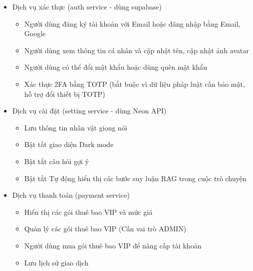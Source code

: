 

\begin{itemize}

\item Dịch vụ xác thực (auth service - dùng supabase)
\begin{itemize}
\item Người dùng đăng ký tài khoản với Email hoặc đăng nhập bằng Email, Google
\item Người dùng xem thông tin cá nhân và cập nhật tên, cập nhật ảnh avatar
\item Người dùng có thể đổi mật khẩu hoặc dùng quên mật khẩu
\item Xác thực 2FA bằng TOTP (bắt buộc vì dữ liệu pháp luật cần bảo mật, hỗ trợ đổi thiết bị TOTP)
\end{itemize}
\item Dịch vụ cài đặt (setting service - dùng Neon API)
\begin{itemize}
\item Lưu thông tin nhân vật giọng nói
\item Bật tắt giao diện Dark mode
\item Bật tắt câu hỏi gợi ý
\item Bật tắt Tự động hiển thị các bước suy luận RAG trong cuộc trò chuyện
\end{itemize}
\item Dịch vụ thanh toán (payment service)
\begin{itemize}
\item Hiển thị các gói thuê bao VIP và mức giá



\item Quản lý các gói thuê bao VIP (Cần vai trò ADMIN)


   \item Người dùng mua gói thuê bao VIP để nâng cấp tài khoản
   \item Lưu lịch sử giao dịch


\end{itemize}
\end{itemize}
